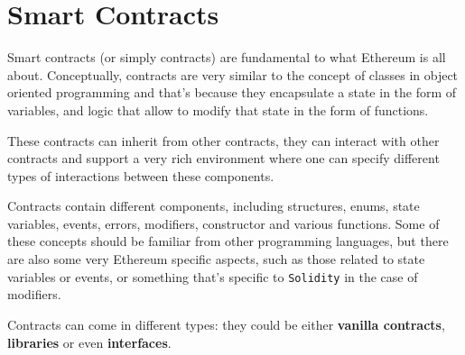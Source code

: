 \section{Smart Contracts}\label{smart-contracts}

Smart contracts (or simply contracts) are fundamental to what Ethereum
is all about. Conceptually, contracts are very similar to the concept of
classes in object oriented programming and that's because they
encapsulate a state in the form of variables, and logic that allow to
modify that state in the form of functions.

These contracts can inherit from other contracts, they can interact with
other contracts and support a very rich environment where one can
specify different types of interactions between these components.

Contracts contain different components, including structures, enums,
state variables, events, errors, modifiers, constructor and various
functions. Some of these concepts should be familiar from other
programming languages, but there are also some very Ethereum specific
aspects, such as those related to state variables or events, or
something that's specific to \texttt{Solidity} in the case of modifiers.

Contracts can come in different types: they could be either
\textbf{vanilla contracts}, \textbf{libraries} or even
\textbf{interfaces}.
